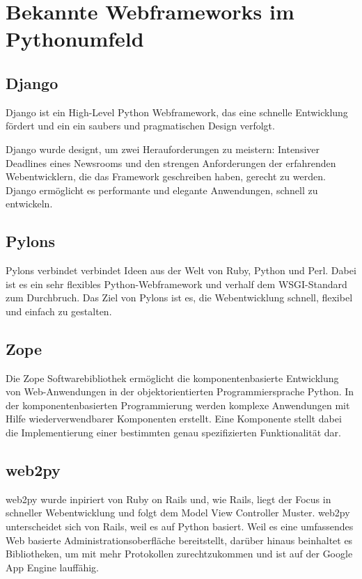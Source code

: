 \section{Bekannte Webframeworks im Pythonumfeld}
\subsection{Django}
Django ist ein High-Level Python Webframework, das eine schnelle Entwicklung
fördert und ein ein saubers und pragmatischen Design verfolgt. 

Django wurde designt, um zwei Herauforderungen zu meistern: Intensiver
Deadlines eines Newsrooms und den strengen Anforderungen der erfahrenden
Webentwicklern, die das Framework geschreiben haben, gerecht zu werden. Django
ermöglicht es performante und elegante Anwendungen, schnell zu entwickeln.
\cite{django}


\subsection{Pylons}
Pylons verbindet verbindet Ideen aus der Welt von Ruby, Python und Perl. Dabei
ist es ein sehr flexibles Python-Webframework und verhalf dem WSGI-Standard zum
Durchbruch. Das Ziel von Pylons ist es, die Webentwicklung schnell, flexibel und
einfach zu gestalten.\cite{pylons}

\subsection{Zope}
Die Zope Softwarebibliothek ermöglicht die komponentenbasierte Entwicklung von 
Web-Anwendungen in der objektorientierten Programmiersprache Python. In der 
komponentenbasierten Programmierung werden komplexe Anwendungen mit Hilfe 
wiederverwendbarer Komponenten erstellt. Eine Komponente stellt dabei  die
Implementierung einer bestimmten genau spezifizierten Funktionalität
dar.\cite{ueberzope}

\subsection{web2py}
web2py wurde inpiriert von Ruby on Rails und, wie Rails, liegt der Focus in
schneller Webentwicklung und folgt dem Model View Controller Muster. web2py
unterscheidet sich von Rails, weil es auf Python basiert. Weil es eine
umfassendes Web basierte Administrationsoberfläche bereitstellt, darüber hinaus
beinhaltet es Bibliotheken, um mit mehr Protokollen zurechtzukommen und ist auf
der Google App Engine lauffähig.\cite{web2py} 


